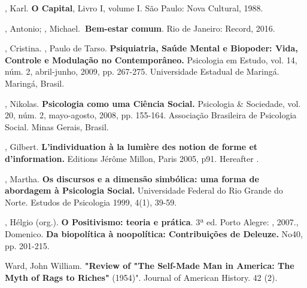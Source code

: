 , Karl. \textbf{O Capital}, Livro I, volume I. São Paulo: Nova
Cultural, 1988.

, Antonio; , Michael.\textbf{~Bem-estar comum}. Rio de
Janeiro: Record, 2016.

, Cristina. , Paulo de Tarso.
\textbf{Psiquiatria, Saúde Mental e Biopoder: Vida, Controle e Modulação
no Contemporâneo.} Psicologia em Estudo, vol. 14, núm. 2, abril-junho,
2009, pp. 267-275. Universidade Estadual de Maringá. Maringá, Brasil.

, Nikolas. \textbf{Psicologia como uma Ciência Social.} Psicologia
\& Sociedade, vol. 20, núm. 2, mayo-agosto, 2008, pp. 155-164.
Associação Brasileira de Psicologia Social. Minas Gerais, Brasil.

, Gilbert. \textbf{L'individuation à la lumière des notion de
forme et d'information.} Editions Jérôme Millon, Paris 2005, p91.
Hereafter .

, Martha. \textbf{Os discursos e a dimensão simbólica: uma
forma de abordagem à Psicologia Social.} Universidade Federal do Rio
Grande do Norte. Estudos de Psicologia 1999, 4(1), 39-59.

, Hélgio (org.). \textbf{O Positivismo: teoria e prática}. 3ª
ed. Porto Alegre: , 2007., Domenico. \textbf{Da biopolítica
à noopolítica: Contribuições de Deleuze.}  No40, pp. 201-215.

Ward, John William. \textbf{"Review of "The Self-Made Man in America:
The Myth of Rags to Riches"} (1954)". Journal of American History. 42
(2).
